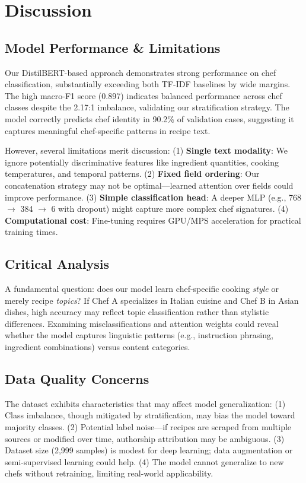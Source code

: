 \documentclass[twocolumn,10pt]{article}
\begin{document}
\section{Discussion}

\subsection{Model Performance \& Limitations}

Our DistilBERT-based approach demonstrates strong performance on chef classification, substantially exceeding both TF-IDF baselines by wide margins. The high macro-F1 score (0.897) indicates balanced performance across chef classes despite the 2.17:1 imbalance, validating our stratification strategy. The model correctly predicts chef identity in 90.2\% of validation cases, suggesting it captures meaningful chef-specific patterns in recipe text.

However, several limitations merit discussion: (1) \textbf{Single text modality}: We ignore potentially discriminative features like ingredient quantities, cooking temperatures, and temporal patterns. (2) \textbf{Fixed field ordering}: Our concatenation strategy may not be optimal—learned attention over fields could improve performance. (3) \textbf{Simple classification head}: A deeper MLP (e.g., 768 $\rightarrow$ 384 $\rightarrow$ 6 with dropout) might capture more complex chef signatures. (4) \textbf{Computational cost}: Fine-tuning requires GPU/MPS acceleration for practical training times.

\subsection{Critical Analysis}

A fundamental question: does our model learn chef-specific cooking \textit{style} or merely recipe \textit{topics}? If Chef A specializes in Italian cuisine and Chef B in Asian dishes, high accuracy may reflect topic classification rather than stylistic differences. Examining misclassifications and attention weights could reveal whether the model captures linguistic patterns (e.g., instruction phrasing, ingredient combinations) versus content categories.

\subsection{Data Quality Concerns}

The dataset exhibits characteristics that may affect model generalization: (1) Class imbalance, though mitigated by stratification, may bias the model toward majority classes. (2) Potential label noise—if recipes are scraped from multiple sources or modified over time, authorship attribution may be ambiguous. (3) Dataset size (2,999 samples) is modest for deep learning; data augmentation or semi-supervised learning could help. (4) The model cannot generalize to new chefs without retraining, limiting real-world applicability. 
\end{document}
